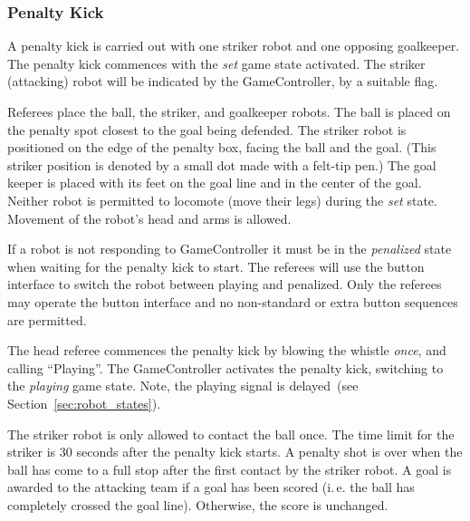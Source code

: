 \documentclass[12pt]{article}
\newcommand{\ie}{\mbox{i.\,e.}\xspace}
\newcommand{\eg}{\mbox{e.\,g.}\xspace}
\newcommand{\cf}{see\xspace}
\newcommand{\PenaltyKickTime}{30 seconds\xspace}
\begin{document}

\subsubsection{Penalty Kick}
\label{sec:penalty_kick}

A penalty kick is carried out with one striker robot and one opposing goalkeeper.
The penalty kick commences with the \textit{set} game state activated.
The striker (attacking) robot will be indicated by the GameController, by a suitable flag.

Referees place the ball, the striker, and goalkeeper robots. The ball is placed on the penalty spot closest to the goal being defended. The striker robot is positioned on the edge of the penalty box, facing the ball and the goal. (This striker position is denoted by a small dot made with a felt-tip pen.) The goal keeper is placed with its feet on the goal line and in the center of the goal.
Neither robot is permitted to locomote (move their legs) during the \textit{set} state. Movement of the robot's head and arms is allowed.

If a robot is not responding to GameController it must be in the \emph{penalized} state when waiting for the penalty kick to start.
The referees will use the button interface to switch the robot between playing and penalized.
Only the referees may operate the button interface and no non-standard or extra button sequences are permitted.

The head referee commences the penalty kick by blowing the whistle \textit{once}, and calling ``Playing''.
The GameController activates the penalty kick, switching to the \emph{playing} game state.
Note, the playing signal is delayed~(\cf Section~\ref{sec:robot_states}).

The striker robot is only allowed to contact the ball once.
The time limit for the striker is \PenaltyKickTime after the penalty kick starts.
A penalty shot is over when the ball has come to a full stop after the first contact by the striker robot.
A goal is awarded to the attacking team if a goal has been scored (\ie the ball has completely crossed the goal line).
Otherwise, the score is unchanged.
\end{document}
